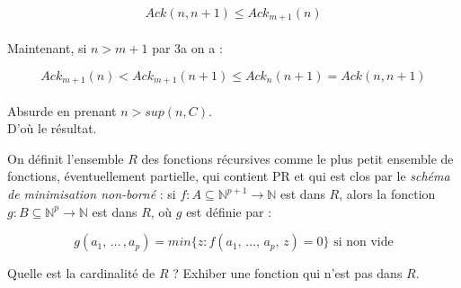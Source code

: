 \documentclass[12pt,letterpaper,boxed]{hmcpset}
\begin{document}
\begin{solution}
\begin{solution}[(e)]
   $$ Ack(n,n+1) \leq Ack_{m+1}(n) $$
   \ \\
   
  \noindent Maintenant, si $n > m+1$ par 3a on a :
   
   $$ Ack_{m+1}(n) < Ack_{m+1}(n+1) \leq Ack_{n}(n+1) = Ack(n,n+1) $$ 
   \ \\
   \noindent Absurde en prenant $n > sup(n,C)$.
   \\
   D'où le résultat.
   \end{solution}

\end{solution}

\begin{problem}[Question 4]

On définit l'ensemble $R$ des fonctions récursives comme le plus petit ensemble de fonctions, éventuellement partielle, qui contient PR et qui est clos par le \textit{schéma de minimisation non-borné} : si $f : A \subseteq \mathbb{N}^{p+1} \to \mathbb{N}$ est dans $R$, alors la fonction $g : B \subseteq \mathbb{N}^{p} \to \mathbb{N}$ est dans $R$, où $g$ est définie par :

$$ g(a_{1}, \, \dots \,, a_{p}) = min \{ z : f(a_{1}, \, \dots , \, a_{p} , \, z) = 0 \} \text{ si non vide}$$
 
Quelle est la cardinalité de $R$ ? Exhiber une fonction qui n'est pas dans $R$.

\end{problem}
\end{document}
